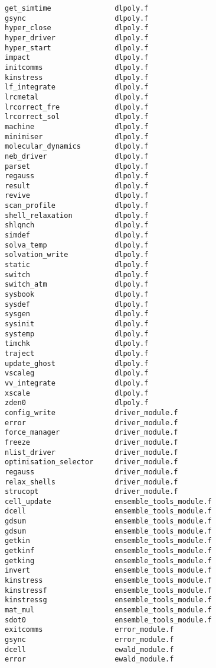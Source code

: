 \begin{verbatim}
get_simtime               dlpoly.f
gsync                     dlpoly.f
hyper_close               dlpoly.f
hyper_driver              dlpoly.f
hyper_start               dlpoly.f
impact                    dlpoly.f
initcomms                 dlpoly.f
kinstress                 dlpoly.f
lf_integrate              dlpoly.f
lrcmetal                  dlpoly.f
lrcorrect_fre             dlpoly.f
lrcorrect_sol             dlpoly.f
machine                   dlpoly.f
minimiser                 dlpoly.f
molecular_dynamics        dlpoly.f
neb_driver                dlpoly.f
parset                    dlpoly.f
regauss                   dlpoly.f
result                    dlpoly.f
revive                    dlpoly.f
scan_profile              dlpoly.f
shell_relaxation          dlpoly.f
shlqnch                   dlpoly.f
simdef                    dlpoly.f
solva_temp                dlpoly.f
solvation_write           dlpoly.f
static                    dlpoly.f
switch                    dlpoly.f
switch_atm                dlpoly.f
sysbook                   dlpoly.f
sysdef                    dlpoly.f
sysgen                    dlpoly.f
sysinit                   dlpoly.f
systemp                   dlpoly.f
timchk                    dlpoly.f
traject                   dlpoly.f
update_ghost              dlpoly.f
vscaleg                   dlpoly.f
vv_integrate              dlpoly.f
xscale                    dlpoly.f
zden0                     dlpoly.f
config_write              driver_module.f
error                     driver_module.f
force_manager             driver_module.f
freeze                    driver_module.f
nlist_driver              driver_module.f
optimisation_selector     driver_module.f
regauss                   driver_module.f
relax_shells              driver_module.f
strucopt                  driver_module.f
cell_update               ensemble_tools_module.f
dcell                     ensemble_tools_module.f
gdsum                     ensemble_tools_module.f
gdsum                     ensemble_tools_module.f
getkin                    ensemble_tools_module.f
getkinf                   ensemble_tools_module.f
getking                   ensemble_tools_module.f
invert                    ensemble_tools_module.f
kinstress                 ensemble_tools_module.f
kinstressf                ensemble_tools_module.f
kinstressg                ensemble_tools_module.f
mat_mul                   ensemble_tools_module.f
sdot0                     ensemble_tools_module.f
exitcomms                 error_module.f
gsync                     error_module.f
dcell                     ewald_module.f
error                     ewald_module.f

\end{verbatim}
